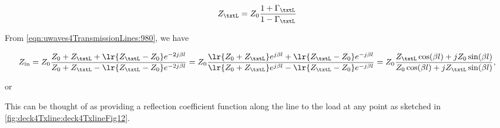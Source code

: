 \begin{dmath}\label{eqn:uwaves4TransmissionLinesCore:1420}
Z_\txtL
= Z_0 \frac{1 + \Gamma_\txtL}{1 - \Gamma_\txtL}
\end{dmath}

From \cref{eqn:uwaves4TransmissionLines:980}, we have

\begin{dmath}\label{eqn:uwaves4TransmissionLinesCore:1440}
Z_{\textrm{in}} 
= Z_0 \frac{Z_0 + Z_\txtL + \lr{Z_\txtL - Z_0} e^{-2 j \beta l}}{Z_0 + Z_\txtL - \lr{Z_\txtL - Z_0} e^{-2 j \beta l}}
= Z_0 \frac{\lr{Z_0 + Z_\txtL} e^{j\beta l} + \lr{Z_\txtL - Z_0} e^{- j \beta l}}{\lr{Z_0 + Z_\txtL} e^{j\beta l} - \lr{Z_\txtL - Z_0} e^{- j \beta l}}
= Z_0 
\frac
{Z_\txtL \cos( \beta l ) + j Z_0 \sin(\beta l ) }
{Z_0 \cos( \beta l ) + j Z_\txtL \sin(\beta l ) },
\end{dmath}

or

This can be thought of as providing a reflection coefficient function along the line to the load at any point as sketched in \cref{fig:deck4Txline:deck4TxlineFig12}.


